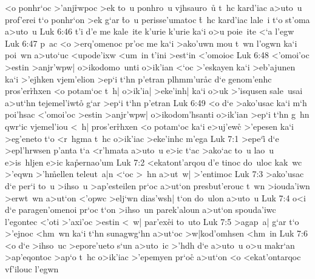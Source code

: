 <o
ponhr`oc
>'anj\r{r}wpoc
>ek
to~u
ponhro~u
vjhsauro~u\r{}
t~hc
kard'iac
a>uto~u
prof'erei
t`o
ponhr`on
>ek
g`ar
\r{t}o~u
perisse'umatoc
\r{t}~hc
kard'iac
lale~i
t`o
st'oma
a>uto~u\bibvsend
\vs Luk 6:46
t'i
d'e
me
kale~ite
k'urie
k'urie
ka`i
o>u
poie~ite
<`a
l'egw\bibvsend
\vs Luk 6:47
p~ac
<o
>erq'omenoc
pr'oc
me
ka`i
>ako'uwn
mou
t~wn
l'ogwn
ka`i
poi~wn
a>uto`uc
<upode'ixw
<um~in
t'ini
>est`in
<'omoioc\bibvsend
\vs Luk 6:48
<'omoi'oc
>estin
>anjr'wpw|
o>ikodomo~unti
o>ik'ian
<`oc
>'eskayen
ka`i
>eb'ajunen
ka`i
>'ejhken
vjem'elion
>ep`i
t`hn
p'etran
plhmm'ur\r{a}c
d`e
genom'enhc
pros'er\r{r}hxen
<o
potam`oc
t~h|
o>ik'ia|
>eke'inh|
ka`i
o>uk
>'isqusen
sale~usai
a>ut`hn
tejemel'iwto\r{}
g`ar
>ep`i
t`hn
p'etran\bibvsend
\vs Luk 6:49
<o
d`e
>ako'usac
ka`i
m`h
poi'hsac
<'omoi'oc
>estin
>anjr'wpw|
o>ikodom'hsanti
o>ik'ian
>ep`i
t`hn
g~hn
qwr`ic
vjemel'iou
<~h|
pros'er\r{r}hxen
<o
potam`oc
ka`i
e>uj'ewc\r{}
>'epesen
ka`i
>eg'eneto
t`o
<r~hgma
t~hc
o>ik'iac
>eke'inhc
m'ega\bibvsend
\vs Luk 7:1
>epe`i\r{}
d`e
>epl'hrwsen
p'anta
t`a
<r'hmata
a>uto~u
e>ic
t`ac
>ako`ac
to~u
lao~u
e>is~hljen
e>ic
ka\r{p}ernao'um\bibvsend
{}
\vs Luk 7:2
<ekatont'arqou
d'e
tinoc
do~uloc
kak~wc
>'eqwn
>'h\r{m}ellen
teleut~a|n
<`oc
>~hn
a>ut~w|
>'entimoc\bibvsend
\vs Luk 7:3
>ako'usac
d`e
per`i
to~u
>ihso~u
>ap'esteilen
pr`oc
a>ut`on
presbut'erouc
t~wn
>iouda'iwn
>erwt~wn
a>ut`on
<'opwc
>elj`wn
dias'wsh|
t`on
do~ulon
a>uto~u\bibvsend
\vs Luk 7:4
o<i
d`e
paragen'omenoi
pr`oc
t`on
>ihso~un
parek'aloun
a>ut`on
spouda'iwc
l'egontec
<'oti
>'axi'oc
>estin
<~w|
par'ex\r{e}i
to~uto\bibvsend
\vs Luk 7:5
>agap~a|
g`ar
t`o
>'ejnoc
<hm~wn
ka`i
t`hn
sunagwg`hn
a>ut`oc
>w|kod'omhsen
<hm~in\bibvsend
\vs Luk 7:6
<o
d`e
>ihso~uc
>epore'ueto
s`un
a>uto~ic
>'hdh
d`e
a>uto~u
o>u
makr`an
>ap'eqontoc
>ap`o
t~hc
o>ik'iac
>'epemyen
pr`oc\r{}
a>ut`on
<o
<ekat'ontarqoc
vf'ilouc
l'egwn
